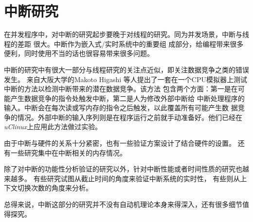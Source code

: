 \section{中断研究}
\label{sec:intr_study}

在并发程序中，对中断的研究起步要晚于对线程的研究。同为并发场景，中断与线程的差距
很大。\cite{Regehr:2007:IVV:1268075.1268150}中断作为嵌入式/实时系统中的重要组
成部分，给编程带来很多便利，同时使用不当的话也很容易带来很多问题。\cite{Lee:2007:HRE:1534850}

中断的研究中有很大一部分与线程研究的关注点近似，即关注数据竞争之类的错误发生。
\cite{6004502, DBLP:journals/ijdsn/TchamgoueKJ13}来自大阪大学的Makoto Higashi
等人提出了一套在一个CPU模拟器上测试中断的方法以检测中断带来的潜在数据竞争。该方法
包含两个方面：第一是在可能产生数据竞争的指令处触发中断，第二是人为修改外部中断给
中断处理程序的输入。中断会在每次读或写内存的指令之后触发，以此覆盖所有可能产生数
据竞争的情况。外部中断的输入序列则是在程序运行之前就手动准备好。他们已经在
\emph{uClinux}上应用此方法做过实验。\cite{Higashi:2010:EMC:1808266.1808278}

由于中断与硬件的关系十分紧密，也有一些验证方案设计了结合硬件的设置。\cite{Yang:4261310}
还有一些研究集中在中断相关的内存情况。\cite{Chatterjee:2003:SSA:1760267.1760276}

除了对中断的功能性分析验证的研究以外，针对中断性能或者时间性质的研究也越来越多。
有些研究试图从截止时间的角度来验证中断系统的实时性\cite{10.1109/TSE.2004.64}，
有些则从上下文切换次数的角度来分析\cite{6148915}。

总得来说，中断这部分的研究并不没有自动机理论本身来得深入，还有很多细节值得探究。


